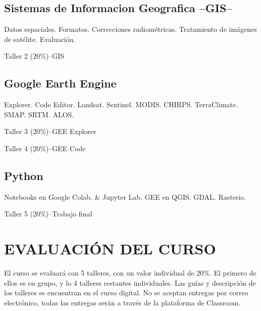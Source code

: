 \documentclass[a4paper,twoside,11pt,]{article}
\begin{document}
\subsection {Sistemas de Informacion Geografica --GIS--}
Datos espaciales. Formatos. Correcciones radiométricas.  Tratamiento de imágenes de satélite. Evaluación.
\begin{tcolorbox}[enhanced,width=5in,center upper,  fontupper=\large\bfseries,drop shadow southwest,sharp corners]
Taller 2 (20\%)--GIS
\end{tcolorbox}

\subsection {Google Earth Engine}
Explorer. Code Editor. Landsat. Sentinel. MODIS. CHIRPS. TerraClimate. SMAP. SRTM. ALOS.
\begin{tcolorbox}[enhanced,width=5in,center upper,  fontupper=\large\bfseries,drop shadow southwest,sharp corners]
Taller 3 (20\%)--GEE Explorer
\end{tcolorbox}
\begin{tcolorbox}[enhanced,width=5in,center upper,  fontupper=\large\bfseries,drop shadow southwest,sharp corners]
Taller 4 (20\%)--GEE Code
\end{tcolorbox}

\subsection {Python}
Notebooks en Google Colab. \& Jupyter Lab. GEE en QGIS. GDAL. Rasterio.
\begin{tcolorbox}[enhanced,width=5in,center upper,  fontupper=\large\bfseries,drop shadow southwest,sharp corners]
Taller 5 (20\%)--Trabajo final
\end{tcolorbox}

\section{EVALUACIÓN DEL CURSO}
El curso se evaluará con 5 talleres, con un valor individual de 20\%. El primero de ellos es en grupo, y lo 4 talleres restantes individuales. Las guías y descripción de los talleres se encuentran en el curso digital. No se aceptan entregas por correo electrónico, todas las entregas serán a través de la plataforma de Classroom.
\end{document}
